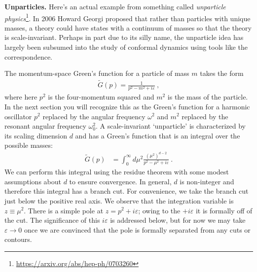 \begin{example} \textbf{Unparticles.}
Here's an actual example from something called \emph{unparticle physics}\footnote{\url{https://arxiv.org/abs/hep-ph/0703260}}. In 2006 Howard Georgi proposed that rather than particles with unique masses, a theory could have states with a continuum of masses so that the theory is scale-invariant. Perhaps in part due to its silly name, the unparticle idea has largely been subsumed into the study of conformal dynamics using tools like the  correspondence.

The momentum-space Green's function for a particle of mass $m$ takes the form
\begin{align}
  \tilde G(p) = \frac{1}{p^2 - m^2 + i\varepsilon} \ ,
\end{align}
where here $p^2$ is the four-momentum squared and $m^2$ is the mass of the particle. In the next section you will recognize this as the Green's function for a harmonic oscillator $p^2$ replaced by the angular frequency $\omega^2$ and $m^2$ replaced by the resonant angular frequency $\omega_0^2$. A scale-invariant `unparticle' is characterized by its scaling dimension $d$ and has a Green's function that is an integral over the possible masses:
\begin{align}
  \tilde G(p) &= \int_0^{\infty} d\mu^2
  \frac{(\mu^2)^{d-2}}{p^2 - \mu^2 + i\varepsilon}
  \ .
\end{align}
We can perform this integral using the residue theorem with some modest assumptions about $d$ to ensure convergence. In general, $d$ is non-integer and therefore this integral has a branch cut. For convenience, we take the branch cut just below the positive real axis.  We observe that the integration variable is $z \equiv \mu^2$. There is a simple pole at $z = p^2+i\varepsilon$; owing to the $+i\varepsilon$ it is formally off of the cut. The significance of this $i\varepsilon$ is addressed below, but for now we may take $\varepsilon\to 0$ once we are convinced that the pole is formally separated from any cuts or contours.


\end{example}
